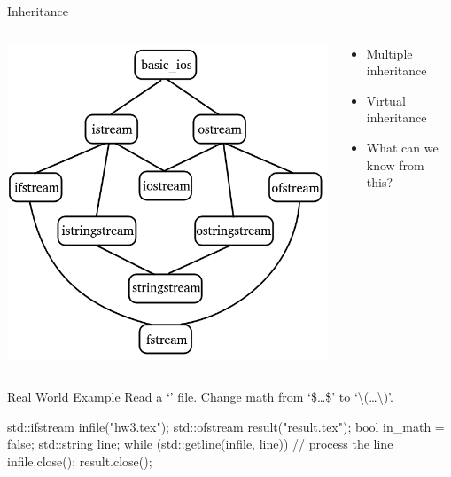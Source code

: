 \begin{frame}{Inheritance}
    \begin{columns}
        \begin{column}{0.6\textwidth}
            \begin{center}
                \includegraphics[scale=0.425]{img/iostream_inheritance.png}
            \end{center}
        \end{column}
        \begin{column}{0.4\textwidth}
            \begin{itemize}
                \item Multiple inheritance
                \item Virtual inheritance
                \item What can we know from this?
            \end{itemize}
        \end{column}
    \end{columns}
\end{frame}

\begin{frame}[fragile]{Real World Example}
    Read a `' file. Change math from `\$\dots\$' to `\textbackslash(\dots\textbackslash)'.
    \begin{cpp}
std::ifstream infile("hw3.tex");
std::ofstream result("result.tex");
bool in_math = false;
std::string line;
while (std::getline(infile, line)) {
  // process the line
}
infile.close();
result.close();
    \end{cpp}
\end{frame}

